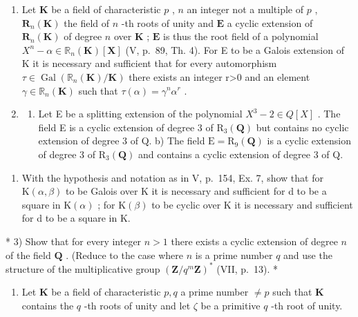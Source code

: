 \BourbakiExerciseGroup

\begin{enumerate}
\def\labelenumi{\arabic{enumi})}
\item
  Let \(\mathbf{K}\) be a field of characteristic \(p\) , \(n\) an integer not a multiple of \(p\) , \(\mathbf{R}_n(\mathbf{K})\) the field of \(n\) -th roots of unity and \(\mathbf{E}\) a cyclic extension of \(\mathbf{R}_n(\mathbf{K})\) of degree \(n\) over \(\mathbf{K}\) ; \(\mathbf{E}\) is thus the root field of a polynomial \(X^{n}-\alpha\in\mathbb{R}_{n}(\mathbf{K})[\mathbf{X}]\) (V, p.~89, Th. 4). For E to be a Galois extension of K it is necessary and sufficient that for every automorphism \(\tau\in\operatorname{Gal}\left(\mathbb{R}_{n}(\mathbf{K})/\mathbf{K}\right)\) there exists an integer r\textgreater0 and an element \(\gamma\in\mathbb{R}_{n}(\mathbf{K})\) such that \(\tau(\alpha)=\gamma^{n}\alpha^{r}\) .
\item
  \begin{enumerate}
  \def\labelenumii{\alph{enumii})}
  \tightlist
  \item
    Let E be a splitting extension of the polynomial \(X^{3}-2\in Q[X]\) . The field E is a cyclic extension of degree 3 of \(\mathrm{R}_{3}(\mathbf{Q})\) but contains no cyclic extension of degree 3 of Q. b) The field \(\mathrm{E}=\mathrm{R}_{9}(\mathbf{Q})\) is a cyclic extension of degree 3 of \(\mathrm{R}_{3}(\mathbf{Q})\) and contains a cyclic extension of degree 3 of Q.
  \end{enumerate}
\end{enumerate}

\begin{enumerate}
\def\labelenumi{\alph{enumi})}
\setcounter{enumi}{2}
\tightlist
\item
  With the hypothesis and notation as in V, p.~154, Ex. 7, show that for \(\mathrm{K}(\alpha,\beta)\) to be Galois over K it is necessary and sufficient for d to be a square in \(\mathrm{K}(\alpha)\) ; for \(\mathrm{K}(\beta)\) to be cyclic over K it is necessary and sufficient for d to be a square in K.
\end{enumerate}

* 3) Show that for every integer \(n > 1\) there exists a cyclic extension of degree \(n\) of the field \(\mathbf{Q}\) . (Reduce to the case where \(n\) is a prime number \(q\) and use the structure of the multiplicative group \((\mathbf{Z} / q^m\mathbf{Z})^*\) (VII, p.~13). *

\begin{enumerate}
\def\labelenumi{\arabic{enumi})}
\setcounter{enumi}{3}
\tightlist
\item
  Let \(\mathbf{K}\) be a field of characteristic \(p, q\) a prime number \(\neq p\) such that \(\mathbf{K}\) contains the \(q\) -th roots of unity and let \(\zeta\) be a primitive \(q\) -th root of unity.
\end{enumerate}


